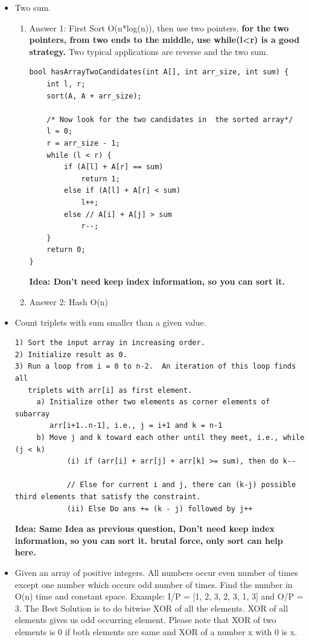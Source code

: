 \documentclass[a4paper,11pt,twoside]{book}
\begin{document}
\begin{itemize}
	\item Two sum. 
\begin{enumerate}
\item Answer 1: First Sort O(n*log(n)), then use two pointers. \textbf{for the two pointers, from two ends to the middle, use while(l<r) is a good strategy.} Two typical applications are reverse and the two sum. 
\begin{lstlisting}[tabsize=3]
bool hasArrayTwoCandidates(int A[], int arr_size, int sum) { 
	int l, r; 
	sort(A, A + arr_size); 
	
	/* Now look for the two candidates in  the sorted array*/
	l = 0; 
	r = arr_size - 1; 
	while (l < r) { 
		if (A[l] + A[r] == sum) 
			return 1; 
		else if (A[l] + A[r] < sum) 
			l++; 
		else // A[i] + A[j] > sum 
			r--; 
	} 
	return 0; 
} 
\end{lstlisting}
\textbf{Idea: Don't need keep index information, so you can sort it. }

\item Answer 2: Hash O(n)
\end{enumerate}

	\item Count triplets with sum smaller than a given value. 
\begin{lstlisting}[breaklines]
1) Sort the input array in increasing order. 
2) Initialize result as 0.
3) Run a loop from i = 0 to n-2.  An iteration of this loop finds all
   triplets with arr[i] as first element.
     a) Initialize other two elements as corner elements of subarray 
        arr[i+1..n-1], i.e., j = i+1 and k = n-1
     b) Move j and k toward each other until they meet, i.e., while (j < k)
            (i) if (arr[i] + arr[j] + arr[k] >= sum), then do k-- 

            // Else for current i and j, there can (k-j) possible third elements that satisfy the constraint.
            (ii) Else Do ans += (k - j) followed by j++ 
\end{lstlisting}
\textbf{Idea: Same Idea as previous question, Don't need keep index information, so you can sort it. brutal force, only sort can help here.}


	\item Given an array of positive integers. All numbers occur even number of times except one number which occurs odd number of times. Find the number in O(n) time and constant space.
Example: I/P = [1, 2, 3, 2, 3, 1, 3] and O/P = 3. The Best Solution is to do bitwise XOR of all the elements. XOR of all elements gives us odd occurring element. Please note that XOR of two elements is 0 if both elements are same and XOR of a number x with 0 is x.


\end{itemize}
\end{document}
